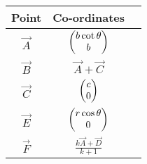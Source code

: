 \begin{tabular}{|c|c|c|}
\hline
Point & Co-ordinates\\
\hline
$\vec{A}$ & $\begin{pmatrix}b\cot{\theta}\\b\end{pmatrix}$\\
\hline
$\vec{B}$ & $\vec{A} + \vec{C}$\\
\hline
$\vec{C}$ & $\begin{pmatrix}c\\0\end{pmatrix}$\\
\hline
$\vec{E}$ & $\begin{pmatrix}r\cos{\theta}\\0\end{pmatrix}$\\
\hline
$\vec{F}$ & $\frac{k\vec{A} + \vec{D}}{k + 1}$\\
\hline
\end{tabular}
